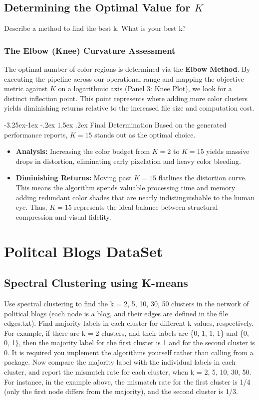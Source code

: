 \documentclass[twoside, 10pt]{article}
\makeatletter
\renewcommand{\paragraph}{\@startsection{paragraph}{4}{\z@}%
    {-3.25ex\@plus -1ex \@minus -.2ex}%
    {1.5ex \@plus .2ex}%
    {\normalfont\normalsize\bfseries}}
\makeatother
\begin{document}
\subsection{Determining the Optimal Value for $K$}
Describe a method to find the best k. What is your best k?

\subsubsection{The Elbow (Knee) Curvature Assessment}
The optimal number of color regions is determined via the \textbf{Elbow Method}. By executing the pipeline across our operational range and mapping the objective metric against $K$ on a logarithmic axis (Panel 3: Knee Plot), we look for a distinct inflection point. This point represents where adding more color clusters yields diminishing returns relative to the increased file size and computation cost.

\paragraph{Final Determination}
Based on the generated performance reports, \textbf{$K = 15$} stands out as the optimal choice.

\begin{itemize}[leftmargin=*]
    \item \textbf{Analysis:} Increasing the color budget from $K = 2$ to $K = 15$ yields massive drops in distortion, eliminating early pixelation and heavy color bleeding.
    \item \textbf{Diminishing Returns:} Moving past $K = 15$ flatlines the distortion curve. This means the algorithm spends valuable processing time and memory adding redundant color shades that are nearly indistinguishable to the human eye. Thus, \textbf{$K = 15$} represents the ideal balance between structural compression and visual fidelity.
\end{itemize}

\section{Politcal Blogs DataSet}

\subsection{Spectral Clustering using K-means}
Use spectral clustering to find the k = 2, 5, 10, 30, 50 clusters in the network of political blogs (each node is a blog, and their edges are defined in the file edges.txt). Find majority labels in
each cluster for different k values, respectively. For example, if there are k = 2 clusters, and their labels are \{0, 1, 1, 1\} and \{0, 0, 1\}, then the majority label for the first cluster is 1 and for the second
cluster is 0. It is required you implement the algorithms yourself rather than calling from a package.
Now compare the majority label with the individual labels in each cluster, and report the mismatch rate for each cluster, when k = 2, 5, 10, 30, 50. For instance, in the example above, the mismatch rate
for the first cluster is 1/4 (only the first node differs from the majority), and the second cluster is 1/3.
\end{document}

